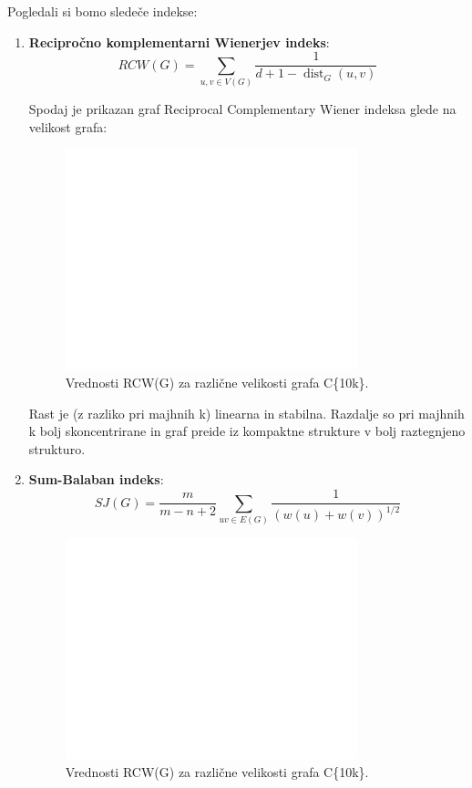 \documentclass[a4paper, 12pt]{article}
\begin{document}
Pogledali si bomo sledeče indekse:
\begin{enumerate}
    \item \textbf{Recipročno komplementarni Wienerjev indeks}:
    \[
    RCW(G) = \sum_{{u,v} \in V(G)} \frac{1}{d + 1 - \operatorname{dist}_G(u,v)}
    \]




Spodaj je prikazan graf Reciprocal Complementary Wiener indeksa glede na velikost grafa:

\begin{figure}[h!]
    \centering
    \includegraphics[width=0.8\textwidth]{rcw_index_plot.png}
    \caption{Vrednosti RCW(G) za različne velikosti grafa C\{10k\}.}
    \label{fig:rcw}
\end{figure}
Rast je (z razliko pri majhnih k) linearna in stabilna. Razdalje so pri majhnih k bolj skoncentrirane in graf preide iz kompaktne strukture v bolj raztegnjeno strukturo. 
    
    \item \textbf{Sum-Balaban indeks}:
    \[
    SJ(G) = \frac{m}{m - n + 2} \sum_{uv \in E(G)} \frac{1}{(w(u) + w(v))^{1/2}}
    \]

    \begin{figure}[h!]
        \centering
        \includegraphics[width=0.8\textwidth]{sb_index_plot.png}
        \caption{Vrednosti RCW(G) za različne velikosti grafa C\{10k\}.}
        \label{fig:rcw}
    \end{figure}


\end{enumerate}
\end{document}
